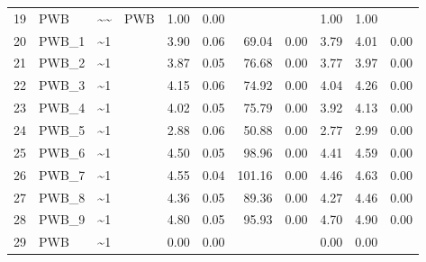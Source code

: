 \documentclass{article}
\begin{document}
\begin{table}[ht]
\begin{tabular}{rlllrrrrrrr}
  19 & PWB & \~{}\~{} & PWB & 1.00 & 0.00 &  &  & 1.00 & 1.00 &  \\ 
  20 & PWB\_1 & \~{}1 &  & 3.90 & 0.06 & 69.04 & 0.00 & 3.79 & 4.01 & 0.00 \\ 
  21 & PWB\_2 & \~{}1 &  & 3.87 & 0.05 & 76.68 & 0.00 & 3.77 & 3.97 & 0.00 \\ 
  22 & PWB\_3 & \~{}1 &  & 4.15 & 0.06 & 74.92 & 0.00 & 4.04 & 4.26 & 0.00 \\ 
  23 & PWB\_4 & \~{}1 &  & 4.02 & 0.05 & 75.79 & 0.00 & 3.92 & 4.13 & 0.00 \\ 
  24 & PWB\_5 & \~{}1 &  & 2.88 & 0.06 & 50.88 & 0.00 & 2.77 & 2.99 & 0.00 \\ 
  25 & PWB\_6 & \~{}1 &  & 4.50 & 0.05 & 98.96 & 0.00 & 4.41 & 4.59 & 0.00 \\ 
  26 & PWB\_7 & \~{}1 &  & 4.55 & 0.04 & 101.16 & 0.00 & 4.46 & 4.63 & 0.00 \\ 
  27 & PWB\_8 & \~{}1 &  & 4.36 & 0.05 & 89.36 & 0.00 & 4.27 & 4.46 & 0.00 \\ 
  28 & PWB\_9 & \~{}1 &  & 4.80 & 0.05 & 95.93 & 0.00 & 4.70 & 4.90 & 0.00 \\ 
  29 & PWB & \~{}1 &  & 0.00 & 0.00 &  &  & 0.00 & 0.00 &  \\ 
   \hline
\end{tabular}
\end{table}
\end{document}
